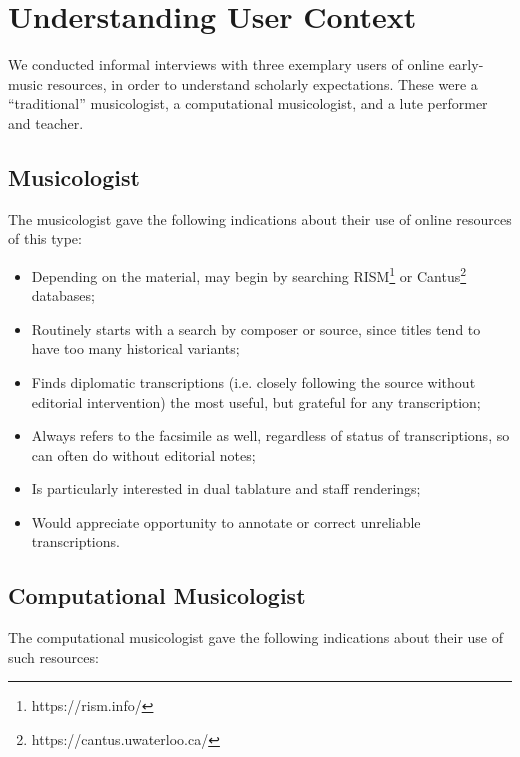 \documentclass[sigconf]{acmart}
\begin{document}
\begin{sloppypar}
  
  \section{Understanding User Context}\label{user-context}

  We conducted informal interviews with three exemplary users of
  online early-music resources, in order to understand scholarly
  expectations. These were a ``traditional'' musicologist, a
  computational musicologist, and a lute performer and teacher.
  
  \subsection{Musicologist}

  The musicologist gave the following indications about their use of
  online resources of this type:

  \begin{itemize}
    \item Depending on the material, may begin by searching
      RISM\footnote{https://rism.info/} or
      Cantus\footnote{https://cantus.uwaterloo.ca/} databases;
    \item Routinely starts with a search by composer or source, since
      titles tend to have too many historical variants;
    \item Finds diplomatic transcriptions (i.e. closely following
      the source without editorial intervention) the most useful,
      but grateful for any transcription;
    \item Always refers to the facsimile as well, regardless of status
      of transcriptions, so can often do without editorial notes;
    \item Is particularly interested in dual tablature and staff
      renderings;
    \item Would appreciate opportunity to annotate or correct
      unreliable transcriptions.
  \end{itemize}
  
  \subsection{Computational Musicologist}

  The computational musicologist gave the following indications about
  their use of such resources:


\end{sloppypar}
\end{document}
